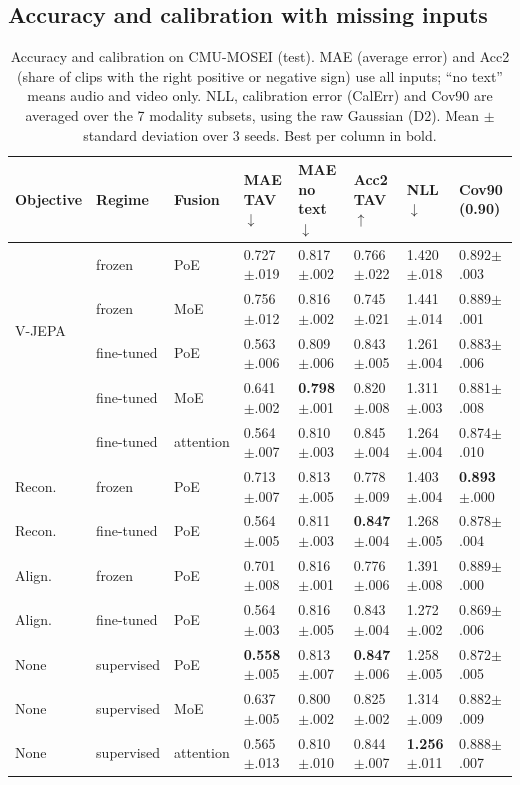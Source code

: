 \documentclass[10pt,twocolumn]{article}
\newcommand{\best}[1]{\textbf{#1}}
\begin{document}
\subsection{Accuracy and calibration with missing inputs}
\begin{table}[t]
\centering\small
\caption{Accuracy and calibration on CMU-MOSEI (test). MAE (average error) and Acc2 (share of clips with the right positive or negative sign) use all inputs; ``no text'' means audio and video only. NLL,
calibration error (CalErr) and Cov90 are averaged over the 7 modality subsets, using the raw Gaussian (D2). Mean $\pm$ standard deviation over 3 seeds. Best per column in bold.}
\label{tab:main}
\setlength{\tabcolsep}{4pt}
\begin{tabular}{llllllll}
\toprule
Objective & Regime & Fusion & MAE TAV $\downarrow$ & MAE no text $\downarrow$ & Acc2 TAV $\uparrow$ & NLL $\downarrow$ & Cov90 (0.90)\\
\midrule
\multirow{4}{*}{V-JEPA} & frozen & PoE & 0.727$\pm$.019 & 0.817$\pm$.002 & 0.766$\pm$.022 & 1.420$\pm$.018 & 0.892$\pm$.003\\
 & frozen & MoE & 0.756$\pm$.012 & 0.816$\pm$.002 & 0.745$\pm$.021 & 1.441$\pm$.014 & 0.889$\pm$.001\\
 & fine-tuned & PoE & 0.563$\pm$.006 & 0.809$\pm$.006 & 0.843$\pm$.005 & 1.261$\pm$.004 & 0.883$\pm$.006\\
 & fine-tuned & MoE & 0.641$\pm$.002 & \best{0.798}$\pm$.001 & 0.820$\pm$.008 & 1.311$\pm$.003 & 0.881$\pm$.008\\
 & fine-tuned & attention & 0.564$\pm$.007 & 0.810$\pm$.003 & 0.845$\pm$.004 & 1.264$\pm$.004 & 0.874$\pm$.010\\
\midrule
Recon. & frozen & PoE & 0.713$\pm$.007 & 0.813$\pm$.005 & 0.778$\pm$.009 & 1.403$\pm$.004 & \best{0.893}$\pm$.000\\
Recon. & fine-tuned & PoE & 0.564$\pm$.005 & 0.811$\pm$.003 & \best{0.847}$\pm$.004 & 1.268$\pm$.005 & 0.878$\pm$.004\\
Align. & frozen & PoE & 0.701$\pm$.008 & 0.816$\pm$.001 & 0.776$\pm$.006 & 1.391$\pm$.008 & 0.889$\pm$.000\\
Align. & fine-tuned & PoE & 0.564$\pm$.003 & 0.816$\pm$.005 & 0.843$\pm$.004 & 1.272$\pm$.002 & 0.869$\pm$.006\\
None & supervised & PoE & \best{0.558}$\pm$.005 & 0.813$\pm$.007 & \best{0.847}$\pm$.006 & 1.258$\pm$.005 & 0.872$\pm$.005\\
None & supervised & MoE & 0.637$\pm$.005 & 0.800$\pm$.002 & 0.825$\pm$.002 & 1.314$\pm$.009 & 0.882$\pm$.009\\
None & supervised & attention & 0.565$\pm$.013 & 0.810$\pm$.010 & 0.844$\pm$.007 & \best{1.256}$\pm$.011 & 0.888$\pm$.007\\
\bottomrule
\end{tabular}
\end{table}
\end{document}
